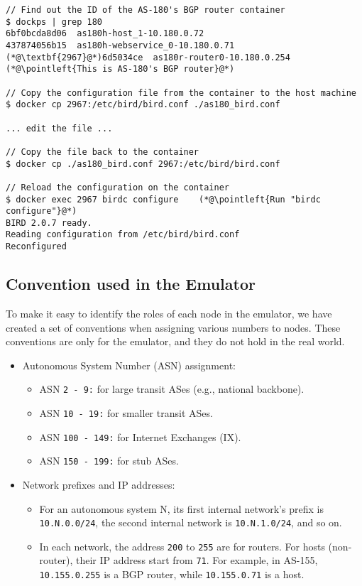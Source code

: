 \begin{lstlisting}
// Find out the ID of the AS-180's BGP router container
$ dockps | grep 180
6bf0bcda8d06  as180h-host_1-10.180.0.72
437874056b15  as180h-webservice_0-10.180.0.71
(*@\textbf{2967}@*)6d5034ce  as180r-router0-10.180.0.254     (*@\pointleft{This is AS-180's BGP router}@*) 

// Copy the configuration file from the container to the host machine
$ docker cp 2967:/etc/bird/bird.conf ./as180_bird.conf

... edit the file ...

// Copy the file back to the container 
$ docker cp ./as180_bird.conf 2967:/etc/bird/bird.conf 

// Reload the configuration on the container
$ docker exec 2967 birdc configure    (*@\pointleft{Run "birdc configure"}@*) 
BIRD 2.0.7 ready.
Reading configuration from /etc/bird/bird.conf
Reconfigured
\end{lstlisting}
 

\subsection{Convention used in the Emulator}

To make it easy to identify the roles of each node in the 
emulator, we have created a set of conventions when assigning
various numbers to nodes. 
These conventions are only for the emulator, and they
do not hold in the real world. 

\begin{itemize}
  \item Autonomous System Number (ASN) assignment:
    \begin{itemize}
      \item ASN \texttt{2 - 9:} for large transit ASes (e.g., national backbone).
      \item ASN \texttt{10 - 19:} for smaller transit ASes.
      \item ASN \texttt{100 - 149:} for Internet Exchanges (IX).
      \item ASN \texttt{150 - 199:} for stub ASes. 
    \end{itemize}

  \item Network prefixes and IP addresses:
    
    \begin{itemize}
      \item For an autonomous system N, its first internal network's prefix
	is \texttt{10.N.0.0/24}, the second internal network
	is \texttt{10.N.1.0/24}, and so on.
   
      \item In each network, the address \texttt{200} to \texttt{255} 
	are for routers. For hosts (non-router), their IP address 
	start from \texttt{71}. For example, in AS-155, 
	\texttt{10.155.0.255} is a BGP router, while \texttt{10.155.0.71}
	is a host. 
    \end{itemize}
     

\end{itemize}



